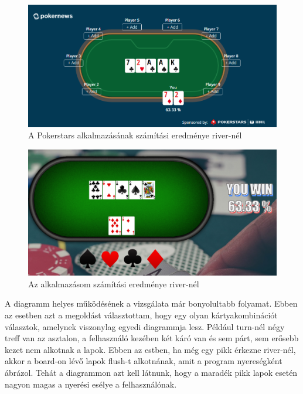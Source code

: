 \begin{figure}[ht]
\centering
\includegraphics[width=\textwidth]{images/test-ps.png}
\caption{A Pokerstars alkalmazásának számítási eredménye river-nél \cite{pokerstars}}
\label{fig:test-ps}
\end{figure}

\begin{figure}[ht]
\centering
\includegraphics[width=\textwidth]{images/test-my.png}
\caption{Az alkalmazásom számítási eredménye river-nél}
\label{fig:test-my}
\end{figure}

A diagramm helyes működésének a vizsgálata már bonyolultabb folyamat. Ebben az esetben azt a megoldást választottam, hogy egy olyan kártyakombinációt választok, amelynek viszonylag egyedi diagrammja lesz. Például turn-nél négy treff van az asztalon, a felhasználó kezében két káró van és sem párt, sem erősebb kezet nem alkotnak a lapok. Ebben az estben, ha még egy pikk érkezne river-nél, akkor a board-on lévő lapok flush-t alkotnának, amit a program nyereségként ábrázol. Tehát a diagrammon azt kell látnunk, hogy a maradék pikk lapok esetén nagyon magas a nyerési esélye a felhasználónak.

